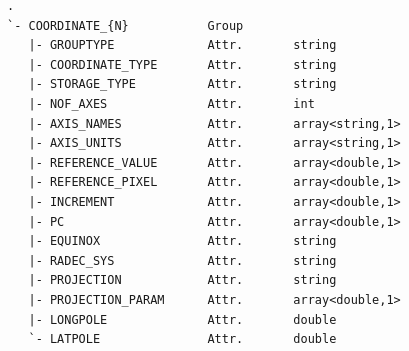\documentclass[a4paper,10pt,bibtotoc]{scrreprt}
\begin{document}
\begin{lstlisting}[float,caption={Structure of the direction
    coordinate group.}]
.
`- COORDINATE_{N}           Group
   |- GROUPTYPE             Attr.       string
   |- COORDINATE_TYPE       Attr.       string
   |- STORAGE_TYPE          Attr.       string
   |- NOF_AXES              Attr.       int
   |- AXIS_NAMES            Attr.       array<string,1>
   |- AXIS_UNITS            Attr.       array<string,1>
   |- REFERENCE_VALUE       Attr.       array<double,1>
   |- REFERENCE_PIXEL       Attr.       array<double,1>
   |- INCREMENT             Attr.       array<double,1>
   |- PC                    Attr.       array<double,1>
   |- EQUINOX               Attr.       string
   |- RADEC_SYS             Attr.       string
   |- PROJECTION            Attr.       string
   |- PROJECTION_PARAM      Attr.       array<double,1>
   |- LONGPOLE              Attr.       double
   `- LATPOLE               Attr.       double
\end{lstlisting}
\end{document}

